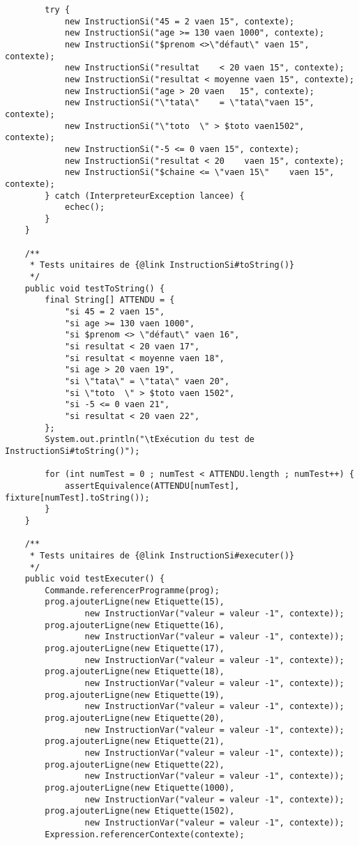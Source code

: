 \begin{enum}
\begin{verbatim}
        try {
            new InstructionSi("45 = 2 vaen 15", contexte);
            new InstructionSi("age >= 130 vaen 1000", contexte);
            new InstructionSi("$prenom <>\"défaut\" vaen 15", contexte);
            new InstructionSi("resultat    < 20 vaen 15", contexte);
            new InstructionSi("resultat < moyenne vaen 15", contexte);
            new InstructionSi("age > 20 vaen   15", contexte);
            new InstructionSi("\"tata\"    = \"tata\"vaen 15", contexte);
            new InstructionSi("\"toto  \" > $toto vaen1502", contexte);
            new InstructionSi("-5 <= 0 vaen 15", contexte);
            new InstructionSi("resultat < 20    vaen 15", contexte);
            new InstructionSi("$chaine <= \"vaen 15\"    vaen 15", contexte);
        } catch (InterpreteurException lancee) {
            echec();
        }
    }
    
    /**
     * Tests unitaires de {@link InstructionSi#toString()}    
     */
    public void testToString() {
        final String[] ATTENDU = {
            "si 45 = 2 vaen 15",
            "si age >= 130 vaen 1000",
            "si $prenom <> \"défaut\" vaen 16",
            "si resultat < 20 vaen 17",
            "si resultat < moyenne vaen 18",
            "si age > 20 vaen 19",
            "si \"tata\" = \"tata\" vaen 20",
            "si \"toto  \" > $toto vaen 1502",
            "si -5 <= 0 vaen 21",
            "si resultat < 20 vaen 22",
        };
        System.out.println("\tExécution du test de InstructionSi#toString()");
        
        for (int numTest = 0 ; numTest < ATTENDU.length ; numTest++) {
            assertEquivalence(ATTENDU[numTest], fixture[numTest].toString());
        }
    }
    
    /**
     * Tests unitaires de {@link InstructionSi#executer()}
     */
    public void testExecuter() {
        Commande.referencerProgramme(prog);
        prog.ajouterLigne(new Etiquette(15), 
                new InstructionVar("valeur = valeur -1", contexte));
        prog.ajouterLigne(new Etiquette(16), 
                new InstructionVar("valeur = valeur -1", contexte));
        prog.ajouterLigne(new Etiquette(17), 
                new InstructionVar("valeur = valeur -1", contexte));
        prog.ajouterLigne(new Etiquette(18), 
                new InstructionVar("valeur = valeur -1", contexte));
        prog.ajouterLigne(new Etiquette(19), 
                new InstructionVar("valeur = valeur -1", contexte));
        prog.ajouterLigne(new Etiquette(20), 
                new InstructionVar("valeur = valeur -1", contexte));
        prog.ajouterLigne(new Etiquette(21), 
                new InstructionVar("valeur = valeur -1", contexte));
        prog.ajouterLigne(new Etiquette(22), 
                new InstructionVar("valeur = valeur -1", contexte));
        prog.ajouterLigne(new Etiquette(1000), 
                new InstructionVar("valeur = valeur -1", contexte));
        prog.ajouterLigne(new Etiquette(1502), 
                new InstructionVar("valeur = valeur -1", contexte));
        Expression.referencerContexte(contexte);


\end{verbatim}
\end{enum}
